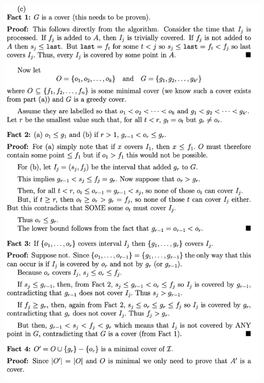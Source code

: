 \begin{spacing}{1.3}
    \newpage
    \includegraphics[scale=1.05]{images/07-exercise-2021f-hw-sol3}


\end{spacing}
